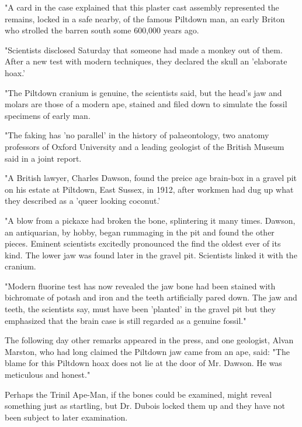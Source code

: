 "A card in the case explained that this plaster cast assembly represented the remains, locked
in a safe nearby, of the famous Piltdown man, an early Briton who strolled the barren south
some 600,000 years ago.

"Scientists disclosed Saturday that someone had made a monkey out of them. After a new
test with modern techniques, they declared the skull an 'elaborate hoax.'

"The Piltdown cranium is genuine, the scientists said, but the head's jaw and molars are those
of a modern ape, stained and filed down to simulate the fossil specimens of early man.

"The faking has 'no parallel' in the history of palaeontology, two anatomy professors of
Oxford University and a leading geologist of the British Museum said in a joint report.

"A British lawyer, Charles Dawson, found the preice age brain-box in a gravel pit on his
estate at Piltdown, East Sussex, in 1912, after workmen had dug up what they described as a
'queer looking coconut.'

"A blow from a pickaxe had broken the bone, splintering it many times. Dawson, an
antiquarian, by hobby, began rummaging in the pit and found the other pieces. Eminent
scientists excitedly pronounced the find the oldest ever of its kind. The lower jaw was found
later in the gravel pit. Scientists linked it with the cranium.

"Modern fluorine test has now revealed the jaw bone had been stained with bichromate of
potash and iron and the teeth artificially pared down. The jaw and teeth, the scientists say,
must have been 'planted' in the gravel pit but they emphasized that the brain case is still
regarded as a genuine fossil."

The following day other remarks appeared in the press, and one geologist, Alvan Marston,
who had long claimed the Piltdown jaw came from an ape, said: "The blame for this
Piltdown hoax does not lie at the door of Mr. Dawson. He was meticulous and honest."

Perhaps the Trinil Ape-Man, if the bones could be examined, might reveal something just as
startling, but Dr. Dubois locked them up and they have not been subject to later examination.

